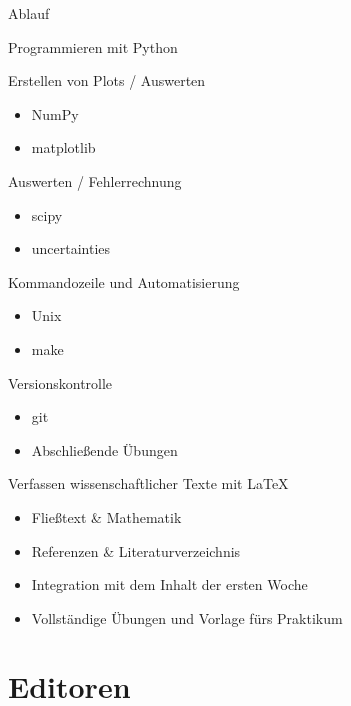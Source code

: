 \begin{frame}{Ablauf}
  \begin{description}
    \item[Montag] Programmieren mit Python
    \item[Dienstag] Erstellen von Plots / Auswerten
      \begin{itemize}
        \item NumPy
        \item matplotlib
      \end{itemize}
    \item[Mittwoch] Auswerten / Fehlerrechnung
      \begin{itemize}
        \item scipy
        \item uncertainties
      \end{itemize}
    \item[Donnerstag] Kommandozeile und Automatisierung
      \begin{itemize}
        \item Unix
        \item make
      \end{itemize}
    \item[Freitag] Versionskontrolle
      \begin{itemize}
        \item git
        \item Abschließende Übungen
      \end{itemize}
    \item[Nächste Woche] Verfassen wissenschaftlicher Texte mit \LaTeX{}
      \begin{itemize}
        \item Fließtext \& Mathematik
        \item Referenzen \& Literaturverzeichnis
        \item Integration mit dem Inhalt der ersten Woche
        \item Vollständige Übungen und Vorlage fürs Praktikum
      \end{itemize}
      
  \end{description}
\end{frame}

\section{Editoren}


